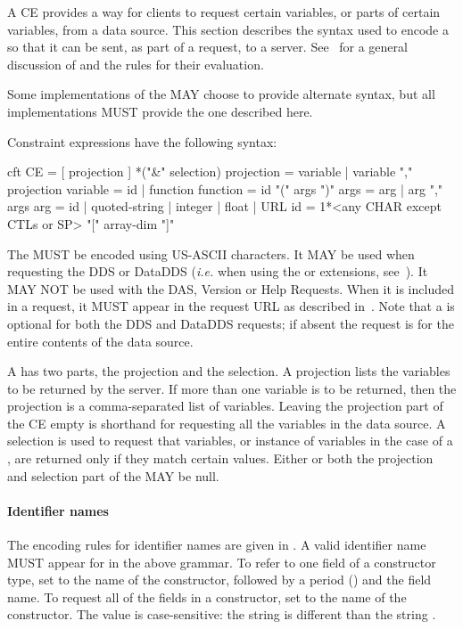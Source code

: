 \documentclass[justify]{nasa-ese}
\begin{document}
A \ac{CE} provides a way for clients to request certain variables, or parts
of certain variables, from a data source. This section describes the syntax
used to encode a \CE so that it can be sent, as part of a request, to a
server. See~ for a general discussion of \CEs and the rules for
their evaluation.

Some implementations of the \DAP MAY choose to provide alternate \CE
syntax, but all implementations MUST provide the one described here.

Constraint expressions have the following syntax:

\begin{vcode}{cft}
CE         = [ projection ] *("\&" selection) 
projection = variable | variable "," projection 
variable   = id | function 
function   = id "(" args ")" 
args       = arg | arg "," args 
arg        = id | quoted-string | integer | float | URL 
id         = 1*<any CHAR except CTLs or SP> "[" array-dim "]"
\end{vcode}
\label{grammar-fix-08.28.07}

The \CE MUST be encoded using US-ASCII characters. It MAY be used when
requesting the DDS or DataDDS ({\it i.e.} when using the  or
 extensions, see~). It MAY NOT be used with
the DAS, Version or Help Requests. When it is included in a request, it MUST
appear in the request URL as described in~. Note
that a \CE is optional for both the DDS and DataDDS requests; if absent the
request is for the entire contents of the data source.

A \CE has two parts, the projection and the selection. A projection lists
the variables to be returned by the \DAP server. If more than one
variable is to be returned, then the projection is a comma-separated list of
variables. Leaving the projection part of the \ac{CE} empty is shorthand for
requesting all the variables in the data source. A selection is used to
request that variables, or instance of variables in the case of a \Sequence,
are returned only if they match certain values. Either or both the projection
and selection part of the \CE MAY be null.

\paragraph{Identifier names}
The encoding rules for identifier names are given in . A 
valid identifier name MUST appear for  in the above grammar. To
refer to one field of a constructor type, set  to the name of the
constructor, followed by a period () and the field name. To request
all of the fields in a constructor, set  to the name of the
constructor. The  value is case-sensitive: the string  is
different than the string .
\end{document}
